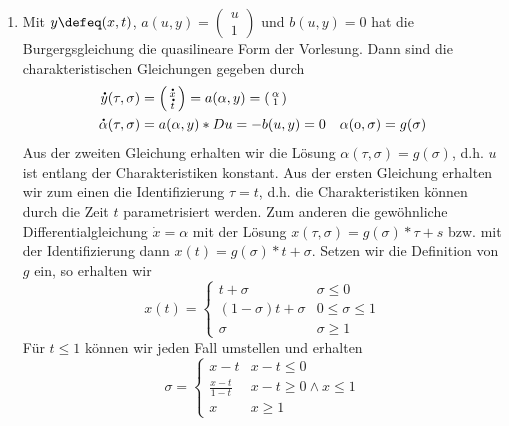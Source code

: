 \begin{exercisePage}
\begin{enumerate}[label=(zu \alph*), leftmargin=*]
	\item Mit $y \defeq (x,t)$, $a(u,y) = \left( \begin{smallmatrix} u \\ 1 \end{smallmatrix} \right)$ und $b(u,y) = 0$ hat die Burgergsgleichung die quasilineare Form der Vorlesung. Dann sind die charakteristischen Gleichungen gegeben durch
	\begin{equation*}
		\begin{aligned}
			\dot{y}(\tau, \sigma) &= \left( \begin{smallmatrix} \dot{x} \\ \dot{t} \end{smallmatrix} \right) = a(\alpha, y) = \left( \begin{smallmatrix} \alpha \\ 1 \end{smallmatrix} \right) \\
			\dot{\alpha}(\tau, \sigma) &= a(\alpha, y) * Du = - b(u,y) = 0 \enskip \mit \enskip \alpha(0,\sigma) = g(\sigma)
		\end{aligned}
	\end{equation*}
	Aus der zweiten Gleichung erhalten wir die Lösung $\alpha(\tau, \sigma) = g(\sigma)$, d.h. $u$ ist entlang der Charakteristiken konstant. Aus der ersten Gleichung erhalten wir zum einen die Identifizierung $\tau = t$, d.h. die Charakteristiken können durch die Zeit $t$ parametrisiert werden. Zum anderen die gewöhnliche Differentialgleichung $\dot{x} = \alpha$ mit der Lösung $x(\tau, \sigma) = g(\sigma) * \tau + s$ bzw. mit der Identifizierung dann $x(t) = g(\sigma) * t + \sigma$. Setzen wir die Definition von $g$ ein, so erhalten wir
	\begin{equation*}
		x(t) = \begin{cases}
			t + \sigma       & \sigma \le 0 \\
			(1-\sigma) t + \sigma & 0 \le \sigma \le 1 \\
			\sigma           & \sigma \ge 1
		\end{cases}
	\end{equation*}
	Für $t \le 1$ können wir jeden Fall umstellen und erhalten
	\begin{equation*}
		\sigma = \begin{cases}
			x - t & x - t \le 0\\
			\frac{x-t}{1-t} & x-t \ge 0 \land x \le 1 \\
			x & x \ge 1
		\end{cases}
	\end{equation*}

\end{enumerate}
\end{exercisePage}

